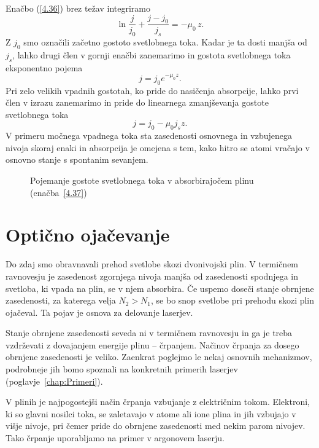 Enačbo (\ref{4.36}) brez težav integriramo
\begin{equation}
\ln\frac{j}{j_{0}}+\frac{j-j_{0}}{j_{s}}=-\mu_{0}\, z.
\label{4.37}
\end{equation}
Z $j_{0}$ smo označili začetno gostoto svetlobnega toka. Kadar je ta dosti
manjša od $j_{s}$, lahko drugi člen v gornji enačbi zanemarimo in gostota svetlobnega
toka eksponentno pojema
\begin{equation}
j = j_0 e^{-\mu_0 z}.
\end{equation}
Pri zelo velikih vpadnih gostotah, ko pride do nasičenja absorpcije, lahko prvi člen v izrazu 
zanemarimo in pride do linearnega zmanjševanja gostote svetlobnega toka
\begin{equation}
j=j_{0}-\mu_{0}j_{s}z.
\label{4.38}
\end{equation}
V primeru močnega vpadnega toka sta zasedenosti osnovnega in vzbujenega nivoja skoraj
enaki in absorpcija je omejena s tem, kako hitro se atomi vračajo
v osnovno stanje s spontanim sevanjem. 

\begin{figure}[h]
\centering
\def\svgwidth{100truemm} 

\caption{Pojemanje gostote svetlobnega toka v absorbirajočem plinu (enačba~\ref{4.37})}
\label{fig:abs2}
\end{figure}

\section{Optično ojačevanje}
Do zdaj smo obravnavali prehod svetlobe skozi dvonivojski plin. V 
termičnem ravnovesju je zasedenost zgornjega nivoja manjša od zasedenosti spodnjega in 
svetloba, ki vpada na plin, se v njem absorbira. 
Če uspemo doseči stanje obrnjene zasedenosti,
za katerega velja $N_{2}>N_{1}$, se bo snop svetlobe pri prehodu skozi plin ojačeval. Ta pojav
je osnova za delovanje laserjev. 

Stanje obrnjene zasedenosti seveda ni v termičnem ravnovesju in ga je treba vzdrževati z dovajanjem 
energije plinu -- črpanjem.
Načinov črpanja za dosego obrnjene zasedenosti je veliko. Zaenkrat poglejmo
le nekaj osnovnih mehanizmov, podrobneje jih bomo spoznali na konkretnih primerih 
laserjev (poglavje~\ref{chap:Primeri}).

V plinih je najpogostejši način črpanja vzbujanje z električnim tokom. Elektroni,
ki so glavni nosilci toka, se zaletavajo v atome ali ione plina in jih vzbujajo
v višje nivoje, pri čemer pride do obrnjene zasedenosti med
nekim parom nivojev. Tako črpanje uporabljamo na primer v argonovem laserju. 

